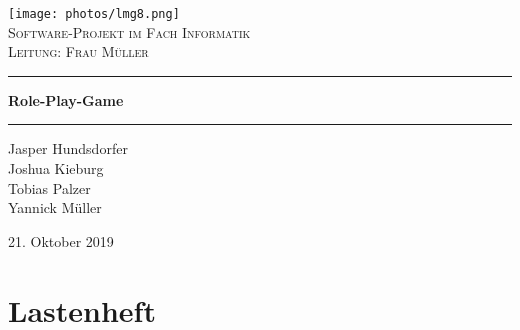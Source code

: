 
\begin{titlepage}
\begin{center}
\texttt{[image: photos/lmg8.png]}\\[1.5cm]    
\textsc{\Large Software-Projekt im Fach Informatik }\\[0.4cm]
\textsc{Leitung: Frau Müller}\\[0.4cm]
\hrule 
\bigskip


{ \huge \bfseries Role-Play-Game }\\[0.3cm]
\medskip
\hrule
\bigskip
\medskip


\begin{minipage}{0.4\textwidth}
\begin{flushleft} \large


\end{flushleft}
\end{minipage}
\hfill
\begin{minipage}{0.4\textwidth}
\begin{flushright} \large
\bigskip
\medskip
Jasper Hundsdorfer \\
Joshua Kieburg\\
Tobias Palzer\\
Yannick Müller\\

\end{flushright}
\end{minipage}

\vfill

{\large 21. Oktober 2019} 

\end{center}

\end{titlepage}

\tableofcontents

\renewcommand*{\listoffigures}{%
	\begingroup
	\tocchapter
	\tocfile{\listfigurename}{lof}
	\endgroup
}

\pagestyle{plain}

\newpage

\section {Lastenheft}
\label{Lastenheft}
